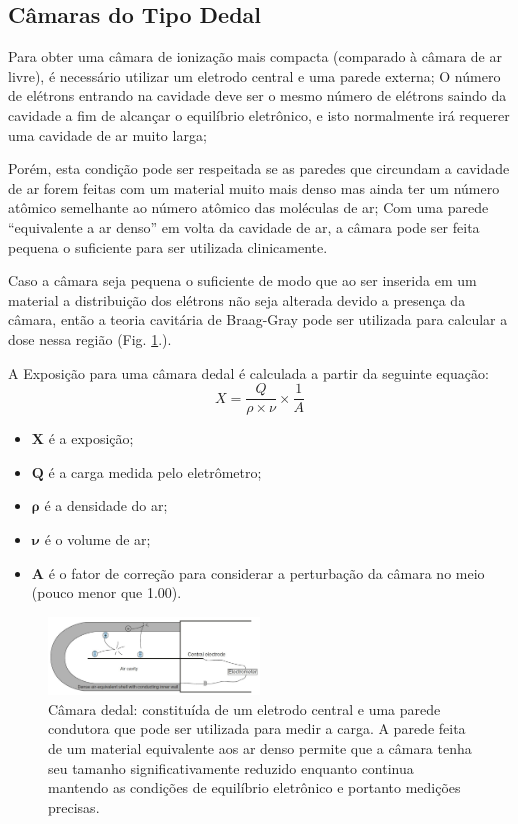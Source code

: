 \documentclass[11pt,a4paper]{article}
\newcounter{exemplo}
\begin{document}
	\subsection{Câmaras do Tipo Dedal}

		Para obter uma câmara de ionização mais compacta (comparado à câmara de ar livre), é necessário utilizar um eletrodo central e uma parede externa;  O número de elétrons entrando na cavidade deve ser o mesmo número de elétrons saindo da cavidade a fim de alcançar o equilíbrio eletrônico, e isto normalmente irá requerer uma cavidade de ar muito larga;
		
		Porém, esta condição pode ser respeitada se as paredes que circundam a cavidade de ar forem feitas com um material muito mais denso mas ainda ter um número atômico semelhante ao número atômico das moléculas de ar; Com uma parede ``equivalente a ar denso'' em volta da cavidade de ar, a câmara pode ser feita pequena o suficiente para ser utilizada clinicamente.

		Caso a câmara seja pequena o suficiente de modo que ao ser inserida em um material a distribuição dos elétrons não seja alterada devido a presença da câmara, então a teoria cavitária de Braag-Gray pode ser utilizada para calcular a dose nessa região (Fig. \ref{fig:camaraDedal}.). 

		A Exposição para uma câmara dedal é calculada a partir da seguinte equação:
			\begin{equation}
				X = \frac{Q}{\rho \times \nu} \times \frac{1}{A}
			\end{equation}

		\begin{exemplo}[Onde]
			\begin{itemize}[label=\textcolor{CarnationPink}{$\star$}]
				\item $\mathbf{X}$ é a exposição;
				\item $\mathbf{Q}$ é a carga medida pelo eletrômetro;
				\item $\mathbf{\rho}$ é a densidade do ar;
				\item $\mathbf{\nu}$ é o volume de ar;
				\item $\mathbf{A}$ é o fator de correção para considerar a perturbação da câmara no meio (pouco menor que 1.00).
			\end{itemize}
		\end{exemplo}

		\begin{figure}[h]
			\centering
			\includegraphics[width=0.5\textwidth]{Imagens/camaraDedal.jpg}
			\caption{Câmara dedal: constituída de um eletrodo central e uma parede condutora que pode ser utilizada para medir a carga. A parede feita de um material equivalente aos ar denso permite que a câmara tenha seu tamanho significativamente reduzido enquanto continua mantendo as condições de equilíbrio eletrônico e portanto medições precisas.}
			\label{fig:camaraDedal}
		\end{figure}
\end{document}
